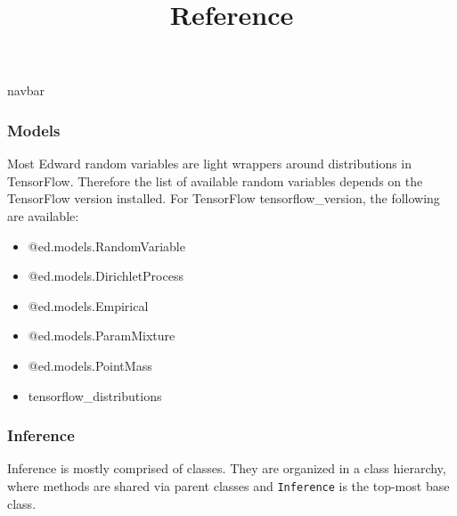 \title{Reference}

{{navbar}}

\subsubsection{Models}

Most Edward random variables are light wrappers around distributions
in TensorFlow. Therefore the list of available random variables
depends on the TensorFlow version installed. For TensorFlow
{{tensorflow_version}}, the following are available:

\begin{itemize}
  \item @{ed.models.RandomVariable}
  \item @{ed.models.DirichletProcess}
  \item @{ed.models.Empirical}
  \item @{ed.models.ParamMixture}
  \item @{ed.models.PointMass}
  \item {{tensorflow_distributions}}
\end{itemize}

\subsubsection{Inference}

Inference is mostly comprised of classes. They are organized in a
class hierarchy, where methods are shared via parent classes and
\texttt{Inference} is the top-most base class.

